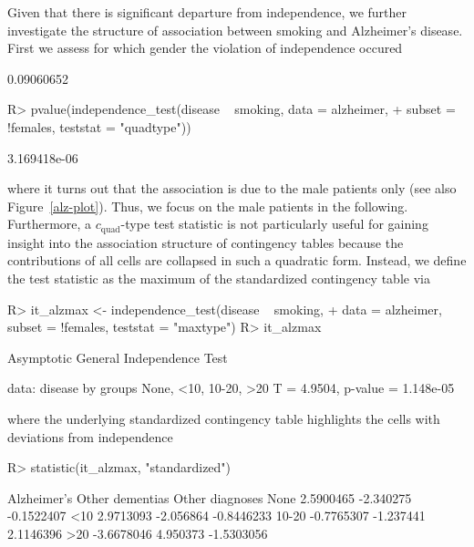 \documentclass{article}
\newenvironment{Schunk}{}{}
\begin{document}
Given that there is significant departure from independence, we further
investigate the structure of association between smoking and Alzheimer's
disease. First we assess for which gender the violation of independence 
occured
\begin{Schunk}
\begin{Soutput}
[1] 0.09060652
\end{Soutput}
\begin{Sinput}
R> pvalue(independence_test(disease ~ smoking, data = alzheimer, 
+     subset = !females, teststat = "quadtype"))
\end{Sinput}
\begin{Soutput}
[1] 3.169418e-06
\end{Soutput}
\end{Schunk}
where it turns out that the association is due to the male patients only
(see also Figure~\ref{alz-plot}). Thus, we focus on the male patients in 
the following.
Furthermore, a $c_$-type test statistic is not particularly useful 
for gaining insight into the association structure of contingency tables
because the contributions of all cells are collapsed in such a quadratic form.
Instead, we define the test statistic as the maximum of the 
standardized contingency table via
\begin{Schunk}
\begin{Sinput}
R> it_alzmax <- independence_test(disease ~ smoking, 
+     data = alzheimer, subset = !females, teststat = "maxtype")
R> it_alzmax
\end{Sinput}
\begin{Soutput}
	Asymptotic General Independence Test

data:  disease by groups None, <10, 10-20, >20 
T = 4.9504, p-value = 1.148e-05
\end{Soutput}
\end{Schunk}
where the underlying standardized contingency table highlights the cells with
deviations from independence
\begin{Schunk}
\begin{Sinput}
R> statistic(it_alzmax, "standardized")
\end{Sinput}
\begin{Soutput}
      Alzheimer's Other dementias Other diagnoses
None    2.5900465       -2.340275      -0.1522407
<10     2.9713093       -2.056864      -0.8446233
10-20  -0.7765307       -1.237441       2.1146396
>20    -3.6678046        4.950373      -1.5303056
\end{Soutput}
\end{Schunk}
\end{document}
